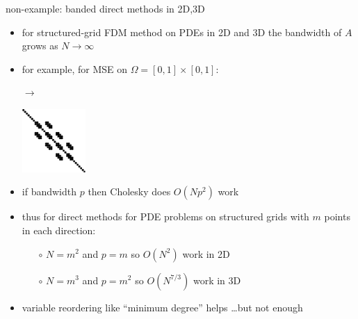 \documentclass[hide notes,intlimits,usenames,dvipsnames]{beamer}
\begin{document}
\begin{frame}{non-example:  banded direct methods in 2D,3D}
\begin{itemize}
\item for structured-grid FDM method on PDEs in 2D and 3D the bandwidth of $A$ grows as $N \to \infty$
\item for example, for MSE on $\Omega=[0,1]\times[0,1]$:

\begin{center}
\begin{tikzpicture}[scale=1.6,baseline]  \end{tikzpicture} \qquad \begin{minipage}[b]{5mm} $\to$ \vspace{10mm} \end{minipage} \qquad \includegraphics[width=0.19\textwidth]{figs/spybanded}
\end{center}

\item if bandwidth $p$ then Cholesky does $O(N p^2)$ work
\item thus for direct methods for PDE problems on structured grids with $m$ points in each direction:
	\begin{itemize}
	\item[$\circ$] $N=m^2$ and $p=m$ so $O(N^2)$ work in 2D
	\item[$\circ$] $N=m^3$ and $p=m^2$ so $O(N^{7/3})$ work in 3D
	\end{itemize}
\item variable reordering like ``minimum degree'' helps \dots but not enough
\end{itemize}
\end{frame}
\end{document}
